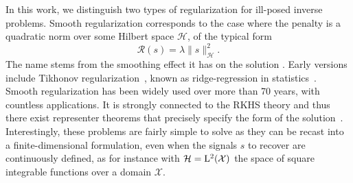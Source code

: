 \documentclass[12pt]{article}
\begin{document}
    In this work, we distinguish two types of regularization for ill-posed inverse problems. Smooth regularization corresponds to the case where the penalty is a quadratic norm over some Hilbert space $\mathcal{H}$, of the typical form 
    \begin{equation*}
        \mathcal{R} (s) = \lambda \| s \|_{\mathcal{H}}^2.
    \end{equation*}
    The name stems from the smoothing effect it has on the solution \cite{Kimeldorf1970}. Early versions include Tikhonov regularization~\cite{tikhonov1963solution}, known as ridge-regression in statistics~\cite{Hoerl1962ridge}. Smooth regularization has been widely used over more than 70 years, with countless applications. %
    It is strongly connected to the RKHS theory and thus there exist representer theorems that precisely specify the form of the solution~\cite{Scholkopf2001generalized}. Interestingly, these problems are fairly simple to solve as they can be recast into a finite-dimensional formulation, even when the signals $s$ to recover are continuously defined, as for instance with $\mathcal{H} = \mathrm{L}^2(\mathcal{X})$ the space of square integrable functions over a domain $\mathcal{X}$. 
\end{document}
